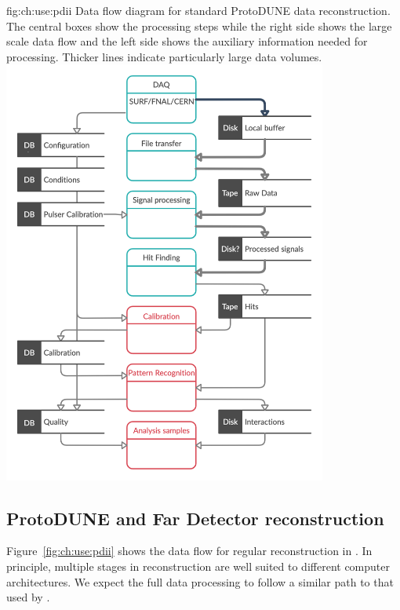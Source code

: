 \documentclass[../main-v1.tex]{subfiles}
\begin{document}
\begin{dunefigure}
{fig:ch:use:pdii}
{Data flow diagram for standard ProtoDUNE data reconstruction. The central boxes show the processing steps while the right side shows the large scale data flow  and the left side shows the auxiliary information needed for processing. Thicker lines indicate particularly large data volumes.}
\includegraphics[width=0.8\textwidth]{graphics/IntroFigures/Data_processing_FD_v3.png}
\end{dunefigure}

\subsection{ProtoDUNE and Far Detector reconstruction}\label{sec:use:pdii}

Figure~\ref{fig:ch:use:pdii} shows the data flow for regular reconstruction in .  %
In principle, multiple stages in reconstruction are well suited to different computer architectures.  We expect the full  data processing to follow a similar path to that used by .  
\end{document}
